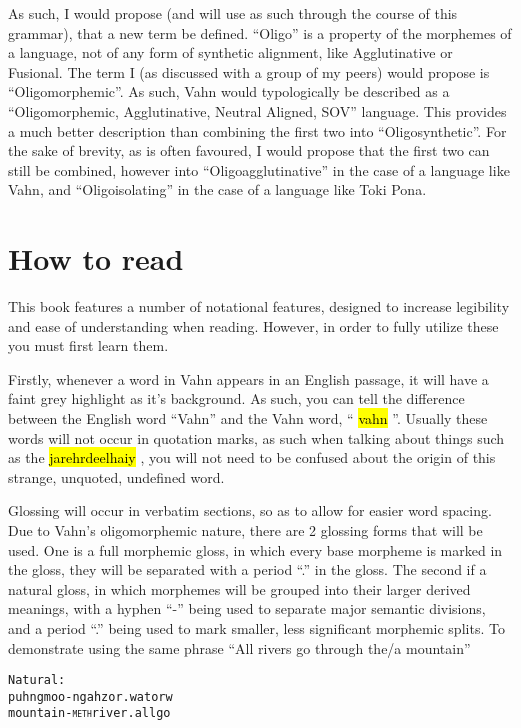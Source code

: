 \documentclass{article}
\newcommand{\hlv}[2][gray]{ {\sethlcolor{#1} \hl{#2}} }
\begin{document}
As such, I would propose (and will use as such through the course of this grammar), that a new term
be defined. ``Oligo'' is a property of the morphemes of a language, not of any form of synthetic
alignment, like Agglutinative or Fusional. The term I (as discussed with a group of my peers) would
propose is ``Oligomorphemic''. As such, Vahn would typologically be described as a ``Oligomorphemic,
Agglutinative, Neutral Aligned, SOV'' language. This
provides a much better description than combining the first two into ``Oligosynthetic''. For the
sake of brevity, as is often favoured, I would propose that the first two can still be combined,
however into ``Oligoagglutinative'' in the case of a language like Vahn, and ``Oligoisolating'' in
the case of a language like Toki Pona.

\section{How to read}

This book features a number of notational features, designed to increase legibility and ease of
understanding when reading. However, in order to fully utilize these you must first learn them.

Firstly, whenever a word in Vahn appears in an English passage, it will have a faint grey highlight
as it's background. As such, you can tell the difference between the English word ``Vahn'' and the
Vahn word, ``\hlv{vahn}''. Usually these words will not occur in quotation marks, as such when
talking about things such as the \hlv{jarehrdeelhaiy}, you will not need to be confused about the
origin of this strange, unquoted, undefined word.

Glossing will occur in verbatim sections, so as to allow for easier word spacing. Due to Vahn's
oligomorphemic nature, there are 2 glossing forms that will be used. One is a full morphemic gloss,
in which every base morpheme is marked in the gloss, they will be separated with a period ``.'' in
the gloss. The second if a natural gloss, in which morphemes will be grouped into their larger
derived meanings, with a hyphen ``-'' being used to separate major semantic divisions, and a period
``.'' being used to mark smaller, less significant morphemic splits. To demonstrate using the same
phrase ``All rivers go through the/a mountain''

\begin{alltt}
    Natural:
    puhngmoo-ngah zor.wa    torw
    mountain-\textsc{meth} river.all go
\end{alltt}
\end{document}
